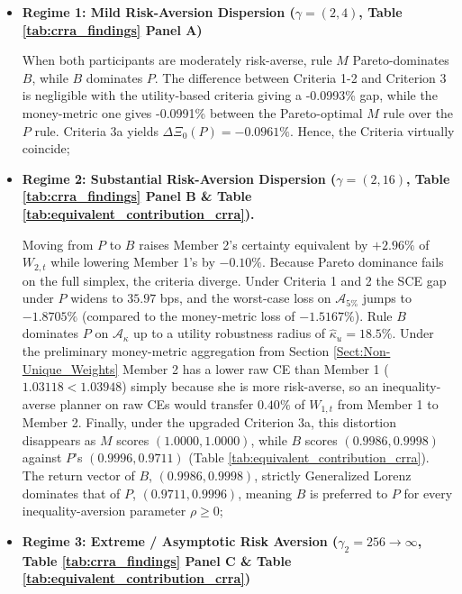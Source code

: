 \begin{itemize}
    \item \textbf{Regime 1: Mild Risk-Aversion Dispersion ($\gamma = (2, 4)$, Table \ref{tab:crra_findings} Panel A)}
    
    When both participants are moderately risk-averse, rule $M$ Pareto-dominates $B$, while $B$ dominates $P$. The difference between Criteria 1-2 and Criterion 3 is negligible with the utility-based criteria giving a -0.0993\% gap, while the money-metric one gives -0.0991\% between the Pareto-optimal $M$ rule over the $P$ rule. Criteria 3a yields $\Delta \Xi_0(P) = -0.0961\%$. Hence, the Criteria virtually coincide;

    \item \textbf{Regime 2: Substantial Risk-Aversion Dispersion ($\gamma = (2, 16)$, Table \ref{tab:crra_findings} Panel B \& Table \ref{tab:equivalent_contribution_crra}).}
    
    Moving from $P$ to $B$ raises Member 2's certainty equivalent by $+2.96\%$ of $W_{2,t}$ while lowering Member 1's by $-0.10\%$. Because Pareto dominance fails on the full simplex, the criteria diverge. Under Criteria 1 and 2 the SCE gap under $P$ widens to $35.97$ bps, and the worst-case loss on $\mathcal{A}_{5\%}$ jumps to $-1.8705\%$ (compared to the money-metric loss of $-1.5167\%$). Rule $B$ dominates $P$ on $\mathcal{A}_\kappa$ up to a utility robustness radius of $\hat{\kappa}_u = 18.5\%$. Under the preliminary money-metric aggregation from Section \ref{Sect:Non-Unique_Weights} Member 2 has a lower raw CE than Member 1 ($1.03118 < 1.03948$) simply because she is more risk-averse, so an inequality-averse planner on raw CEs would transfer $0.40\%$ of $W_{1,t}$ from Member 1 to Member 2. Finally, under the upgraded Criterion 3a, this distortion disappears as $M$ scores $(1.0000, 1.0000)$, while $B$ scores $(0.9986, 0.9998)$ against $P$'s $(0.9996, 0.9711)$ (Table \ref{tab:equivalent_contribution_crra}). The return vector of $B$, $(0.9986, 0.9998)$, strictly Generalized Lorenz dominates that of $P$, $(0.9711, 0.9996)$, meaning $B$ is preferred to $P$ for every inequality-aversion parameter $\rho \geq 0$;

    \item \textbf{Regime 3: Extreme / Asymptotic Risk Aversion ($\gamma_2 = 256 \to \infty$, Table \ref{tab:crra_findings} Panel C \& Table \ref{tab:equivalent_contribution_crra})}
    

\end{itemize}
